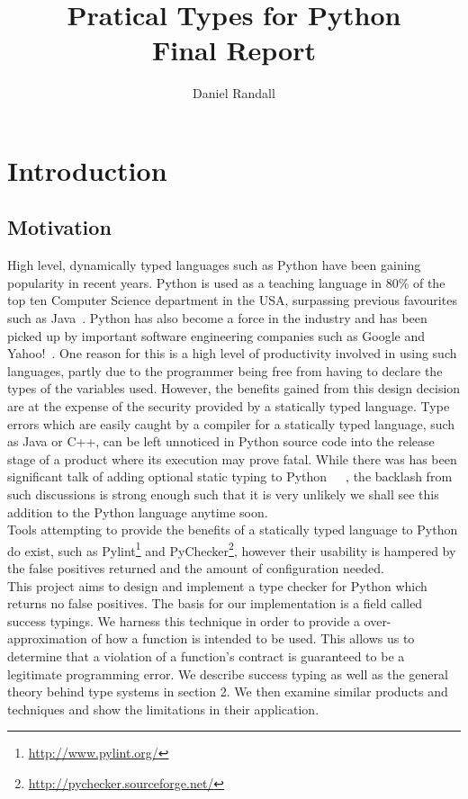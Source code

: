 \documentclass[12pt, titlepage]{article}
\title{Pratical Types for Python \\ Final Report}
\author{Daniel Randall}
\date{}
\begin{document}
\maketitle

\tableofcontents
\newpage

\section{Introduction}
\subsection{Motivation}
High level, dynamically typed languages such as Python have been gaining popularity in recent years. Python is used as a teaching language in 80\% of the top ten Computer Science department in the USA, surpassing previous favourites such as Java~\cite{guoTeaching}. Python has also become a force in the industry and has been picked up by important software engineering companies such as Google and Yahoo!~\cite{organisationsPython}. One reason for this is a high level of productivity involved in using such languages, partly due to the programmer being free from having to declare the types of the variables used. However, the benefits gained from this design decision are at the expense of the security provided by a statically typed language. Type errors which are easily caught by a compiler for a statically typed language, such as Java or C++, can be left unnoticed in Python source code into the release stage of a product where its execution may prove fatal. %
While there was has been significant talk of adding optional static typing to Python~\cite{guido1}~\cite{guido2}~\cite{guido3}, the backlash from such discussions is strong enough such that it is very unlikely we shall see this addition to the Python language anytime soon. \\
Tools attempting to provide the benefits of a statically typed language to Python do exist, such as Pylint\footnote{\url{http://www.pylint.org/}} and PyChecker\footnote{\url{http://pychecker.sourceforge.net/}}, however their usability is hampered by the false positives returned and the amount of configuration needed. \\
This project aims to design and implement a type checker for Python which returns no false positives. The basis for our implementation is a field called success typings. We harness this technique in order to provide a over-approximation of how a function is intended to be used. This allows us to determine that a violation of a function's contract is guaranteed to be a legitimate programming error. We describe success typing as well as the general theory behind type systems in section 2. We then examine similar products and techniques and show the limitations in their application. \\
\end{document}
